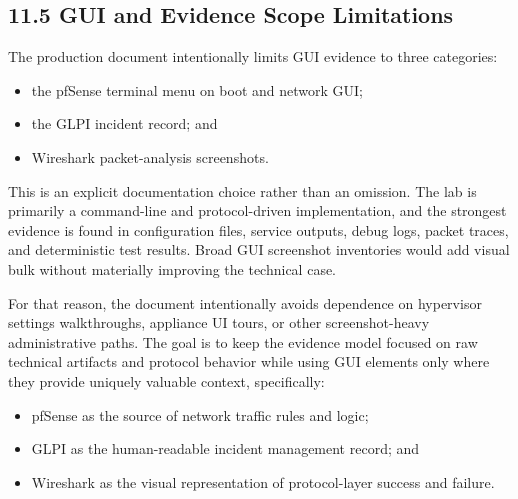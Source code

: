 \documentclass[11pt]{article}
\begin{document}
\subsection{11.5 GUI and Evidence Scope Limitations}
\label{sec:gui-and-evidence-scope-limitations}

The production document intentionally limits GUI evidence to three categories:

\begin{itemize}
    \item the pfSense terminal menu on boot and network GUI;
    \item the GLPI incident record; and
    \item Wireshark packet-analysis screenshots.
\end{itemize}

This is an explicit documentation choice rather than an omission. The lab is primarily a command-line and protocol-driven implementation, and the strongest evidence is found in configuration files, service outputs, debug logs, packet traces, and deterministic test results. Broad GUI screenshot inventories would add visual bulk without materially improving the technical case.

For that reason, the document intentionally avoids dependence on hypervisor settings walkthroughs, appliance UI tours, or other screenshot-heavy administrative paths. The goal is to keep the evidence model focused on raw technical artifacts and protocol behavior while using GUI elements only where they provide uniquely valuable context, specifically:

\begin{itemize}
    \item pfSense as the source of network traffic rules and logic;
    \item GLPI as the human-readable incident management record; and
    \item Wireshark as the visual representation of protocol-layer success and failure.
\end{itemize}

\end{document}
